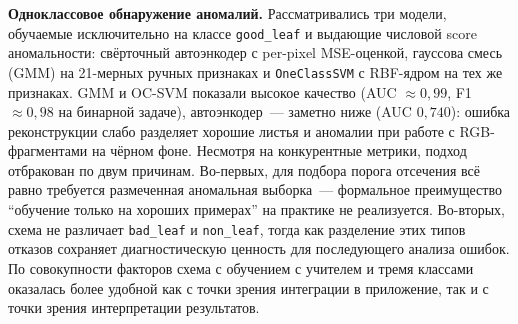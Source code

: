 \textbf{Одноклассовое обнаружение аномалий.} Рассматривались три модели,
обучаемые исключительно на классе \texttt{good\_leaf} и выдающие числовой score
аномальности: свёрточный автоэнкодер с per-pixel MSE-оценкой, гауссова смесь
(GMM) на 21-мерных ручных признаках и \texttt{OneClassSVM} с RBF-ядром на тех
же признаках. GMM и OC-SVM показали высокое качество (AUC $\approx 0{,}99$,
F1 $\approx 0{,}98$ на бинарной задаче), автоэнкодер~--- заметно ниже
(AUC $0{,}740$): ошибка реконструкции слабо разделяет хорошие листья и аномалии
при работе с RGB-фрагментами на чёрном фоне. Несмотря на конкурентные метрики,
подход отбракован по двум причинам. Во-первых, для подбора порога отсечения
всё равно требуется размеченная аномальная выборка~--- формальное преимущество
``обучение только на хороших примерах'' на практике не реализуется.
Во-вторых, схема не различает \texttt{bad\_leaf} и \texttt{non\_leaf}, тогда
как разделение этих типов отказов сохраняет диагностическую ценность для
последующего анализа ошибок. По совокупности факторов схема с обучением с учителем и
тремя классами оказалась более удобной как с точки зрения интеграции в
приложение, так и с точки зрения интерпретации результатов.

